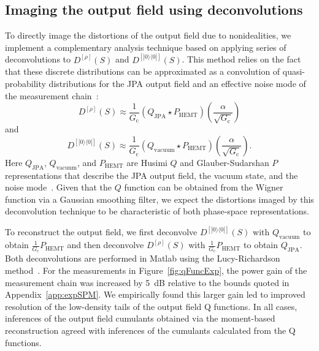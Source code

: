 \documentclass[pra,twocolumn,superscriptaddress]{revtex4-1}
\begin{document}
\subsection{Imaging the output field using deconvolutions}
To directly image the distortions of the output field due to nonidealities, we implement a complementary analysis technique based on applying series of deconvolutions to $D^{[\rho]}\left(S\right)$ and $D^{[\left|0\rangle\langle0\right|]}\left(S\right)$. This method relies on the fact that these discrete distributions can be approximated as a convolution of quasi-probability distributions for the JPA output field and an effective noise mode of the measurement chain~\cite{Kim_PRA_1997}:
\begin{equation}\label{LRone}
D^{[\rho]}\left(S\right) \approx \frac{1}{G_\mathrm{c}}(Q_{\mathrm{JPA}} 
\star P_{\mathrm{HEMT}})(\frac{\alpha}{\sqrt{G_\mathrm{c}}})
\end{equation}
and
\begin{equation}\label{LRtwo}
D^{[\left|0\rangle\langle0\right|]}\left(S\right) \approx \frac{1}{G_\mathrm{c}}(Q_{\mathrm{vacuum}} \star P_{\mathrm{HEMT}})(\frac{\alpha}{\sqrt{G_\mathrm{c}}}).
\end{equation}
Here $Q_{\mathrm{JPA}}$, $Q_{\mathrm{vacuum}}$, and $P_{\mathrm{HEMT}}$ are Husimi $Q$ and Glauber-Sudarshan $P$ representations that describe the JPA output field, the vacuum state, and the noise mode~\cite{Eichler_PRA_2012}. Given that the $Q$ function can be obtained from the Wigner function via a Gaussian smoothing filter, we expect the distortions imaged by this deconvolution technique to be characteristic of both phase-space representations.

To reconstruct the output field, we first deconvolve $D^{[\left|0\rangle\langle0\right|]}\left(S\right)$ with $Q_{\mathrm{vacuum}}$ to obtain $\frac{1}{G_\mathrm{c}}P_{\mathrm{HEMT}}$ and then deconvolve $D^{[\rho]}\left(S\right)$ with $\frac{1}{G_\mathrm{c}}P_{\mathrm{HEMT}}$ to obtain $Q_{\mathrm{JPA}}$. Both deconvolutions are performed in Matlab using the Lucy-Richardson method~\cite{Biggs_97}.
For the measurements in Figure~\ref{fig:qFuncExp}, the power gain of the measurement chain was increased by 5~dB relative to the bounds quoted in Appendix~\ref{app:expSPM}. We empirically found this larger gain led to improved resolution of the low-density tails of the output field Q functions. In all cases, inferences of the output field cumulants obtained via the moment-based reconstruction agreed with inferences of the cumulants calculated from the Q functions.
\end{document}
